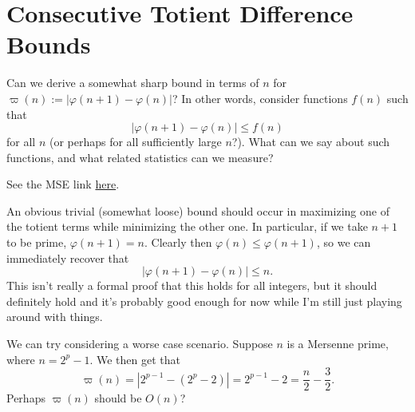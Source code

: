 \documentclass[a4paper, 12pt]{article}
\begin{document}
\section*{Consecutive Totient Difference Bounds}

\begin{sidebox}
    \begin{problem}
        Can we derive a somewhat sharp bound in terms of \( n \) for \( \varpi(n) := |\varphi(n + 1) - \varphi(n)| \)? In other words, consider functions \( f(n) \) such that
        \[
            |\varphi(n + 1) - \varphi(n)| \le f(n)
        \]
        for all \( n \) (or perhaps for all sufficiently large \( n \)?). What can we say about such functions, and what related statistics can we measure?
        
        \vspace{0.3cm}

        See the MSE link \href{https://math.stackexchange.com/questions/4957263/bounds-on-consecutive-differences-of-the-euler-totient-function}{here}.
    \end{problem}
\end{sidebox}

\begin{idea}
    An obvious trivial (somewhat loose) bound should occur in maximizing one of the totient terms while minimizing the other one. In particular, if we take \( n + 1 \) to be prime, \( \varphi(n + 1) = n \). Clearly then \( \varphi(n) \le \varphi(n + 1) \), so we can immediately recover that
    \[
        |\varphi(n + 1) - \varphi(n)| \le n
    .\]
    This isn't really a formal proof that this holds for all integers, but it should definitely hold and it's probably good enough for now while I'm still just playing around with things.
\end{idea}

\begin{idea}
    We can try considering a worse case scenario. Suppose \( n \) is a Mersenne prime, where \( n = 2^p - 1 \). We then get that
    \[
        \varpi(n) = |2^{p - 1} - (2^p - 2)| = 2^{p - 1} - 2 = \frac{n}{2} - \frac{3}{2}
    .\]
    Perhaps \( \varpi(n) \) should be \( O(n) \)?
\end{idea}
\end{document}
